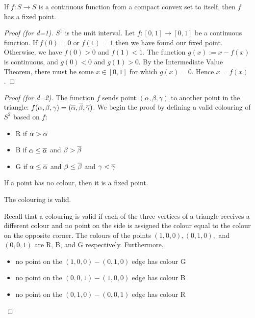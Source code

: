 	\begin{theorem}
		If $f: S \rightarrow S$ is a continuous function from a compact convex
		set to itself, then $f$ has a fixed point.
	\end{theorem}

	\begin{proof}[Proof \emph{(for d=1)}]
		$S^1$ is the unit interval. Let $f:[0,1] \rightarrow [0,1]$ be a
		continuous function. If $f(0)=0$ or $f(1)=1$ then we have found our
		fixed point. Otherwise, we have $f(0)>0$ and $f(1)<1$. The function
		$g(x) := x - f(x)$ is continuous, and $g(0)<0$ and $g(1)>0$. By the
		Intermediate Value Theorem, there must be some $x \in [0,1]$ for which
		$g(x) = 0$. Hence $x = f(x)$.
	\end{proof}

	\begin{proof}[Proof \emph{(for d=2)}]
		The function $f$ sends point $(\alpha, \beta, \gamma)$ to another point
		in the triangle: $f(\alpha, \beta, \gamma) = (\overline{\alpha},
		\overline{\beta}, \overline{\gamma})$. We begin the proof by defining a valid
		colouring of $S^2$ based on $f$:
		\begin{itemize}
			\item R if $\alpha > \overline{\alpha}$
			\item B if $\alpha \le \overline{\alpha}$ and $\beta > \overline{\beta}$
			\item G if $\alpha \le \overline{\alpha}$ and $\beta \le \overline{\beta}$
				and $\gamma < \overline{\gamma}$
		\end{itemize}

		\begin{fact}
			If a point has no colour, then it is a fixed point.
		\end{fact}

		\begin{claim*}
			The colouring is valid.
		\end{claim*}
		\begin{subproof}
			Recall that a colouring is valid if each of the three vertices of a
			triangle receives a different colour and no point on the side is
			assigned the colour equal to the colour on the opposite corner. The
			colours of the points $(1,0,0), (0,1,0),$ and $(0,0,1)$ are R, B,
			and G respectively. Furthermore,
			\begin{itemize}
				\item no point on the $(1,0,0)-(0,1,0)$ edge has colour G
				\item no point on the $(0,0,1)-(1,0,0)$ edge has colour B
				\item no point on the $(0,1,0)-(0,0,1)$ edge has colour R
			\end{itemize}
		\end{subproof}


\end{proof}
